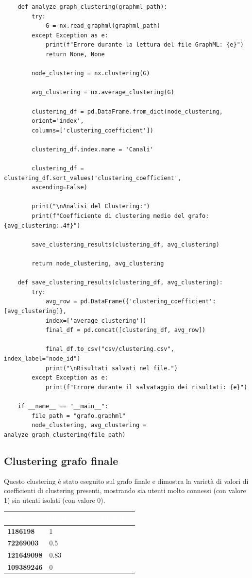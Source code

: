 \documentclass[12pt]{article}
\begin{document}
	\begin{lstlisting}
	def analyze_graph_clustering(graphml_path):
		try:
			G = nx.read_graphml(graphml_path)
		except Exception as e:
			print(f"Errore durante la lettura del file GraphML: {e}")
			return None, None
	
		node_clustering = nx.clustering(G)
	
		avg_clustering = nx.average_clustering(G)
	
		clustering_df = pd.DataFrame.from_dict(node_clustering, 
		orient='index', 
		columns=['clustering_coefficient'])
	
		clustering_df.index.name = 'Canali'
	
		clustering_df = clustering_df.sort_values('clustering_coefficient', 
		ascending=False)
	
		print("\nAnalisi del Clustering:")
		print(f"Coefficiente di clustering medio del grafo: {avg_clustering:.4f}")
	
		save_clustering_results(clustering_df, avg_clustering)
	
		return node_clustering, avg_clustering
	
	def save_clustering_results(clustering_df, avg_clustering):
		try:
			avg_row = pd.DataFrame({'clustering_coefficient': [avg_clustering]}, 
			index=['average_clustering'])
			final_df = pd.concat([clustering_df, avg_row])
	
			final_df.to_csv("csv/clustering.csv", index_label="node_id")
			print("\nRisultati salvati nel file.")
		except Exception as e:
			print(f"Errore durante il salvataggio dei risultati: {e}")
	
	if __name__ == "__main__":
		file_path = "grafo.graphml"
		node_clustering, avg_clustering = analyze_graph_clustering(file_path)
	\end{lstlisting}
	\subsection{Clustering grafo finale}
	Questo clustering è stato eseguito sul grafo finale e dimostra la varietà di valori di coefficienti di clustering presenti, mostrando sia utenti molto connessi (con valore 1) sia utenti isolati (con valore 0).
	\begin{table}[h!]
		\centering
		\begin{tabular}{|p{5cm}|p{5cm}|p{4cm}|}
			\hline
			\cellcolor{darkblue}\textcolor{white}{\textbf{Source}} & 
			\cellcolor{darkblue}\textcolor{white}{\textbf{Clustering\_coefficient}} \\
			\hline
			\textbf{1186198} & 1 \\
			\hline
			\textbf{72269003} & 0.5\\
			\hline
			\textbf{121649098} & 0.83\\
			\hline
			\textbf{109389246} & 0\\
			\hline
		\end{tabular}
	\end{table}
\end{document}
